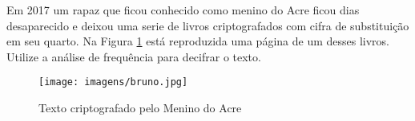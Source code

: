 \begin{exercicio}
Em 2017 um rapaz que ficou conhecido como menino do Acre ficou dias desaparecido e deixou uma serie de livros criptografados com cifra de substituição em seu quarto.
Na Figura \ref{fig:menino-do-acre} está reproduzida uma página de um desses livros.
Utilize a análise de frequência para decifrar o texto.
\end{exercicio}

\begin{figure}[htbp]
  \centering
  \texttt{[image: imagens/bruno.jpg]}
  \caption{Texto criptografado pelo Menino do Acre}
  \label{fig:menino-do-acre}
\end{figure}
